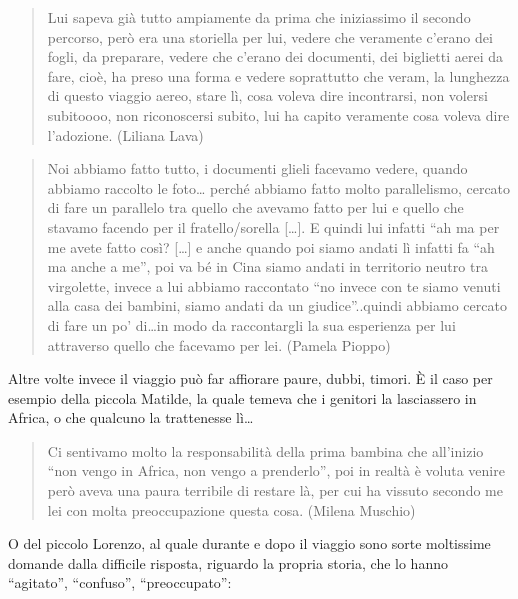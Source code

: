 \documentclass[12pt,oneside,svgnames]{memoir}
\newenvironment{quotationb}%
{\color{maincolor}\begin{leftbar}\begin{quotation}}%
{\end{quotation}\end{leftbar}\ignorespacesafterend}
\begin{document}
\begin{quotationb}
Lui sapeva già tutto ampiamente da prima che iniziassimo il secondo
percorso, però era una storiella per lui, vedere che veramente c'erano
dei fogli, da preparare, vedere che c'erano dei documenti, dei biglietti
aerei da fare, cioè, ha preso una forma e vedere soprattutto che veram,
la lunghezza di questo viaggio aereo, stare lì, cosa voleva dire
incontrarsi, non volersi subitoooo, non riconoscersi subito, lui ha
capito veramente cosa voleva dire l'adozione. (Liliana Lava)
\end{quotationb}

\begin{quotationb}
Noi abbiamo fatto tutto, i documenti glieli facevamo vedere, quando
abbiamo raccolto le foto\ldots{} perché abbiamo fatto molto
parallelismo, cercato di fare un parallelo tra quello che avevamo fatto
per lui e quello che stavamo facendo per il fratello/sorella
{[}\ldots{}{]}. E quindi lui infatti ``ah ma per me avete fatto così?
{[}\ldots{}{]} e anche quando poi siamo andati lì infatti fa ``ah ma
anche a me'', poi va bé in Cina siamo andati in territorio neutro tra
virgolette, invece a lui abbiamo raccontato ``no invece con te siamo
venuti alla casa dei bambini, siamo andati da un giudice''..quindi
abbiamo cercato di fare un po' di\ldots{}in modo da raccontargli la sua
esperienza per lui attraverso quello che facevamo per lei. (Pamela
Pioppo)
\end{quotationb}

Altre volte invece il viaggio può far affiorare paure, dubbi, timori. È
il caso per esempio della piccola Matilde, la quale temeva che i
genitori la lasciassero in Africa, o che qualcuno la trattenesse
lì\ldots{}

\begin{quotationb}
Ci sentivamo molto la responsabilità della prima bambina che all'inizio
``non vengo in Africa, non vengo a prenderlo'', poi in realtà è voluta
venire però aveva una paura terribile di restare là, per cui ha vissuto
secondo me lei con molta preoccupazione questa cosa. (Milena Muschio)
\end{quotationb}

O del piccolo Lorenzo, al quale durante e dopo il viaggio sono sorte
moltissime domande dalla difficile risposta, riguardo la propria storia,
che lo hanno ``agitato'', ``confuso'', ``preoccupato'':
\end{document}
